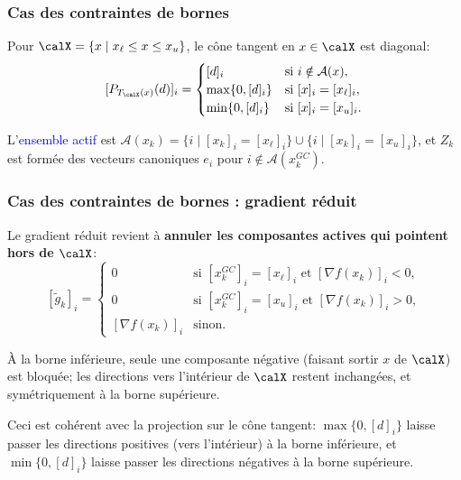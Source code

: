 \documentclass[t,aspectratio=169,usepdftitle=false]{beamer}
\def\cX{\calX}
\begin{document}
\begin{frame}
\frametitle{Cas des contraintes de bornes}

Pour $\cX = \{ x \mid x_\ell \leq x \leq x_u \}$, le cône tangent en $x \in \cX$ est diagonal:
$$
[P_{T_{\cX}(x)}(d)]_i =
\begin{cases}
[d]_i & \text{si } i \notin \mathcal{A}(x), \\
\max\{0,[d]_i\} & \text{si } [x]_i = [x_\ell]_i, \\
\min\{0,[d]_i\} & \text{si } [x]_i = [x_u]_i.
\end{cases}
$$

L'\textcolor{blue}{ensemble actif} est $\mathcal{A}(x_k) = \{ i \mid [x_k]_i = [x_\ell]_i \} \cup \{ i \mid [x_k]_i = [x_u]_i \}$, et $Z_k$ est formée des vecteurs canoniques $e_i$ pour $i \notin \mathcal{A}(x_k^{GC})$.

\end{frame}

\begin{frame}
\frametitle{Cas des contraintes de bornes : gradient réduit}

Le gradient réduit revient à \textbf{annuler les composantes actives qui pointent hors de $\cX$}:
$$
[\tilde{g}_k]_i = \begin{cases}
0 & \text{si } [x_k^{GC}]_i = [x_\ell]_i \text{ et } [\nabla f(x_k)]_i < 0, \\
0 & \text{si } [x_k^{GC}]_i = [x_u]_i \text{ et } [\nabla f(x_k)]_i > 0, \\
{[\nabla f(x_k)]_i} & \text{sinon.}
\end{cases}
$$

\mbox{}

À la borne inférieure, seule une composante négative (faisant sortir $x$ de $\cX$) est bloquée; les directions vers l'intérieur de $\cX$ restent inchangées, et symétriquement à la borne supérieure.

\mbox{}

Ceci est cohérent avec la projection sur le cône tangent: $\max\{0, [d]_i\}$ laisse passer les directions positives (vers l'intérieur) à la borne inférieure, et $\min\{0, [d]_i\}$ laisse passer les directions négatives à la borne supérieure.

\end{frame}
\end{document}
